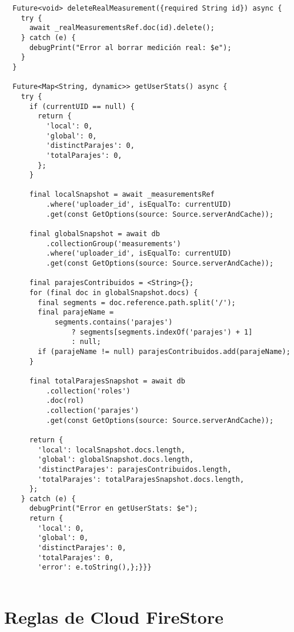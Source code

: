 \begin{verbatim}
  Future<void> deleteRealMeasurement({required String id}) async {
    try {
      await _realMeasurementsRef.doc(id).delete(); 
    } catch (e) {
      debugPrint("Error al borrar medición real: $e");
    }
  }

  Future<Map<String, dynamic>> getUserStats() async {
    try {
      if (currentUID == null) {
        return {
          'local': 0,
          'global': 0,
          'distinctParajes': 0,
          'totalParajes': 0,
        };
      }

      final localSnapshot = await _measurementsRef
          .where('uploader_id', isEqualTo: currentUID)
          .get(const GetOptions(source: Source.serverAndCache));

      final globalSnapshot = await db
          .collectionGroup('measurements')
          .where('uploader_id', isEqualTo: currentUID)
          .get(const GetOptions(source: Source.serverAndCache));

      final parajesContribuidos = <String>{};
      for (final doc in globalSnapshot.docs) {
        final segments = doc.reference.path.split('/');
        final parajeName =
            segments.contains('parajes')
                ? segments[segments.indexOf('parajes') + 1]
                : null;
        if (parajeName != null) parajesContribuidos.add(parajeName);
      }

      final totalParajesSnapshot = await db
          .collection('roles')
          .doc(rol)
          .collection('parajes')
          .get(const GetOptions(source: Source.serverAndCache));

      return {
        'local': localSnapshot.docs.length,
        'global': globalSnapshot.docs.length,
        'distinctParajes': parajesContribuidos.length,
        'totalParajes': totalParajesSnapshot.docs.length,
      };
    } catch (e) {
      debugPrint("Error en getUserStats: $e");
      return {
        'local': 0,
        'global': 0,
        'distinctParajes': 0,
        'totalParajes': 0,
        'error': e.toString(),};}}}


        \end{verbatim}


\newpage
\section{Reglas de Cloud FireStore}
\label{anexo:alg2}

